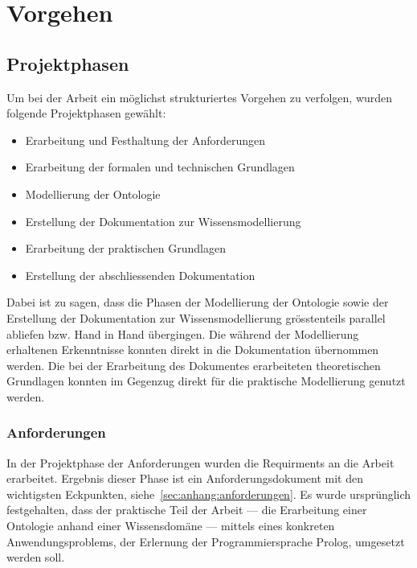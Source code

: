 \chapter{Vorgehen}
\label{chap:vorgehen}

\section{Projektphasen}
\label{sec:projektphasen}

Um bei der Arbeit ein möglichst strukturiertes Vorgehen zu verfolgen, wurden folgende Projektphasen gewählt:
\begin{itemize}
\item Erarbeitung und Festhaltung der Anforderungen
\item Erarbeitung der formalen und technischen Grundlagen
\item Modellierung der Ontologie
\item Erstellung der Dokumentation zur Wissensmodellierung
\item Erarbeitung der praktischen Grundlagen
\item Erstellung der abschliessenden Dokumentation
\end{itemize}

Dabei ist zu sagen, dass die Phasen der Modellierung der Ontologie sowie der Erstellung der Dokumentation zur Wissensmodellierung grösstenteils parallel abliefen bzw. Hand in Hand übergingen. Die während der Modellierung erhaltenen Erkenntnisse konnten direkt in die Dokumentation übernommen werden. Die bei der Erarbeitung des Dokumentes erarbeiteten theoretischen Grundlagen konnten im Gegenzug direkt für die praktische Modellierung genutzt werden.

\subsection{Anforderungen}
\label{subsec:anforderungen}
In der Projektphase der Anforderungen wurden die Requirments an die Arbeit erarbeitet. Ergebnis dieser Phase ist ein Anforderungsdokument mit den wichtigsten Eckpunkten, siehe~\autoref{sec:anhang:anforderungen}. Es wurde ursprünglich festgehalten, dass der praktische Teil der Arbeit --- die Erarbeitung einer Ontologie anhand einer Wissensdomäne --- mittels eines konkreten Anwendungsproblems, der Erlernung der Programmiersprache Prolog, umgesetzt werden soll. 

